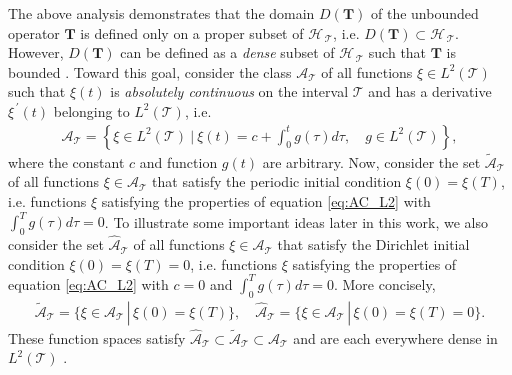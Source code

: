 \documentclass[11pt]{amsart}
\newcommand{\Tb}{\mathbf{T}}
\newcommand{\Tc}{\mathcal{T}}
\newcommand{\Hs}{\mathscr{H}}
\newcommand{\As}{\mathscr{A}}
\begin{document}
The above analysis demonstrates that the domain $D(\Tb)$ of the
unbounded operator $\Tb$ is defined only on a proper subset of $\Hs_{\,\Tc}$,
i.e. $D(\Tb)\subset\Hs_{\,\Tc}$. However, $D(\Tb)$ can be defined as a \emph{dense}
subset of $\Hs_{\,\Tc}$ such that $\Tb$ is bounded
\cite{Reed-1980,Stone:64}. Toward this goal, consider the class
$\As_{\Tc}$ of all functions $\xi\in L^2(\Tc)$ such that $\xi(t)$ is
\emph{absolutely continuous} \cite{Royden:1988:RA} on the interval
$\Tc$ and has a derivative $\xi^{\,\prime}(t)$ belonging to $L^2(\Tc)$,
i.e. \cite{Stone:64,Royden:1988:RA}   
%
\begin{align}\label{eq:AC_L2}
  \As_{\Tc}=
     \left\{
       \xi\in L^2(\Tc) \ \Big| \ \xi(t)=c+\int_0^tg(\tau)d\tau,
       \quad  g\in L^2(\Tc)
     \right\},
\end{align}
%
where the constant $c$ and function $g(t)$ are
arbitrary. Now, consider the set $\tilde{\As}_{\Tc}$ of all
functions $\xi\in\As_{\Tc}$ that satisfy the periodic initial condition
$\xi(0)=\xi(T)$, i.e. functions $\xi$ satisfying the properties of 
equation \eqref{eq:AC_L2} with $\int_0^Tg(\tau)d\tau=0$. To illustrate some
important ideas later in this work, we also consider the
set $\hat{\As}_{\Tc}$ of all functions $\xi\in\As_{\Tc}$ that satisfy the
Dirichlet initial condition $\xi(0)=\xi(T)=0$, i.e. functions $\xi$
satisfying the properties of equation \eqref{eq:AC_L2} with $c=0$ and
$\int_0^Tg(\tau)d\tau=0$. More concisely, 
%
\begin{align}
  \tilde{\As}_{\Tc}=\{\xi\in\As_{\Tc} \,|\, \xi(0)=\xi(T)\}, \quad
  \hat{\As}_{\Tc}=\{\xi\in\As_{\Tc} \,|\, \xi(0)=\xi(T)=0\}.
\end{align}
%
These function spaces satisfy
$\hat{\As}_{\Tc}\subset\tilde{\As}_{\Tc}\subset\As_{\Tc}$ and are each everywhere
dense in $L^2(\Tc)$ \cite{Stone:64}. 
\end{document}
